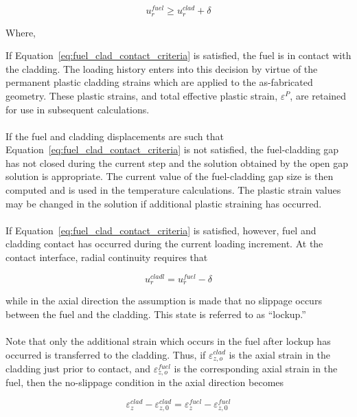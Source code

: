 \begin{equation}
    \label{eq:fuel_clad_contact_criteria}
    u_{r}^{fuel} \geq u_{r}^{clad} + \delta
\end{equation}

Where,

If Equation~\ref{eq:fuel_clad_contact_criteria} is satisfied, the fuel is in contact with the
cladding. The loading history enters into this decision by virtue of the permanent plastic cladding
strains which are applied to the as-fabricated geometry. These plastic strains, and total effective
plastic strain, $\varepsilon^{P}$, are retained for use in subsequent calculations.
\\
\\
If the fuel and cladding displacements are such that Equation~\ref{eq:fuel_clad_contact_criteria} is
not satisfied, the fuel-cladding gap has not closed during the current step and the solution
obtained by the open gap solution is appropriate.  The current value of the fuel-cladding gap size
is then computed and is used in the temperature calculations. The plastic strain values may be
changed in the solution if additional plastic straining has occurred.
\\
\\
If Equation~\ref{eq:fuel_clad_contact_criteria} is satisfied, however, fuel and
cladding contact has occurred during the current loading increment. At the
contact interface, radial continuity requires that

\begin{equation}
    \label{eq:radial_continuity_requirement}
    u_{r}^{cladl} = u_{r}^{fuel} -  \delta
\end{equation}

while in the axial direction the assumption is made that no slippage occurs between the fuel and the
cladding. This state is referred to as ``lockup.''
\\
\\
Note that only the additional strain which occurs in the fuel after lockup has occurred is
transferred to the cladding. Thus, if $\varepsilon_{z,o}^{clad}$ is the axial strain in the cladding
just prior to contact, and $\varepsilon_{z,o}^{fuel}$ is the corresponding axial strain in the fuel,
then the no-slippage condition in the axial direction becomes

\begin{equation}
    \label{eq:no_slippage_condition_axial_direction}
    \varepsilon^{clad}_{z} - \varepsilon^{clad}_{z,0} = \varepsilon^{fuel}_{z} - \varepsilon^{fuel}_{z,0}
\end{equation}


